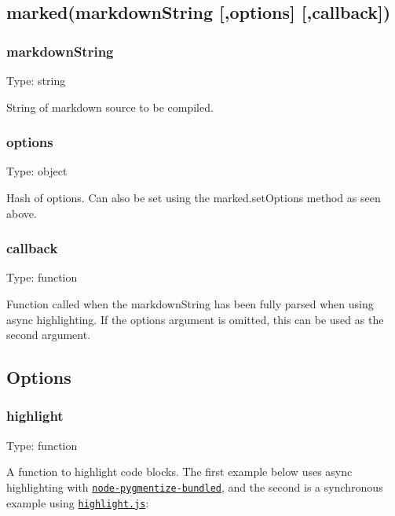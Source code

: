 \subsection*{marked(markdown\+String \mbox{[},options\mbox{]} \mbox{[},callback\mbox{]})}

\subsubsection*{markdown\+String}

Type\+: {\ttfamily string}

String of markdown source to be compiled.

\subsubsection*{options}

Type\+: {\ttfamily object}

Hash of options. Can also be set using the {\ttfamily marked.\+set\+Options} method as seen above.

\subsubsection*{callback}

Type\+: {\ttfamily function}

Function called when the {\ttfamily markdown\+String} has been fully parsed when using async highlighting. If the {\ttfamily options} argument is omitted, this can be used as the second argument.

\subsection*{Options}

\subsubsection*{highlight}

Type\+: {\ttfamily function}

A function to highlight code blocks. The first example below uses async highlighting with \href{https://github.com/rvagg/node-pygmentize-bundled}{\tt node-\/pygmentize-\/bundled}, and the second is a synchronous example using \href{https://github.com/isagalaev/highlight.js}{\tt highlight.\+js}\+:


